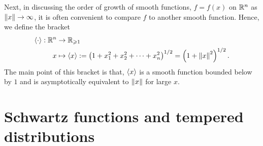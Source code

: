 \documentclass[12pt]{article}
\begin{document}
Next, in discussing the order of growth of smooth functions, $f = f(x)$ on $\R^n$ as $\norm[x] \to \infty$, it is often convenient to compare $f$ to another smooth function. Hence, we define the bracket 
\begin{align*}
\sym[\cdot] : \R^n &\to \R_{\geq 1} \\
x &\mapsto \sym[x] := \brac{ 1 + x_1^2 + x_2^2 + \dots + x_n^2}^{1/2} = \brac{1 + \norm[x]^2}^{1/2}. 
\end{align*}
The main point of this bracket is that,  $\sym[x]$ is a smooth function bounded below by $1$ and is  asymptotically equivalent to $\norm[x]$ for large $x$. 




\section{Schwartz functions and tempered distributions}
\end{document}
